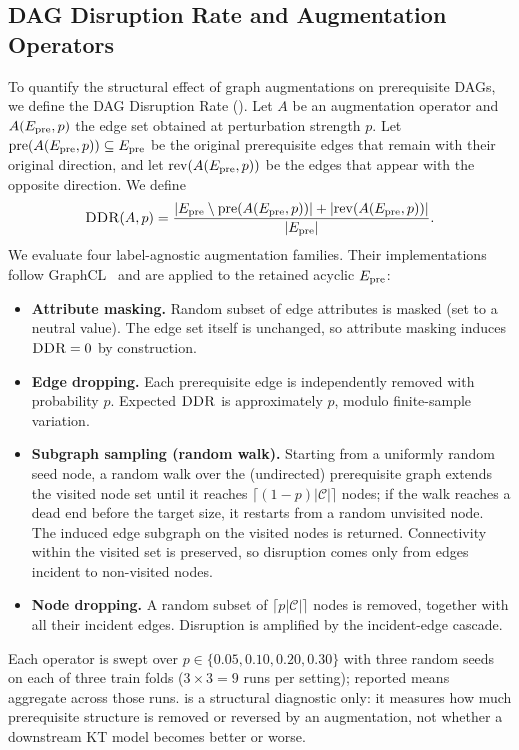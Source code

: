 \subsection{DAG Disruption Rate and Augmentation Operators}
\label{sec:ddr}
To quantify the structural effect of graph augmentations on prerequisite
DAGs, we define the DAG Disruption Rate (\DDR{}). Let $A$ be an
augmentation operator and $A(E_{\text{pre}},p)$ the edge set obtained at
perturbation strength $p$. Let $\mathrm{pre}(A(E_{\text{pre}},p))\subseteq E_{\text{pre}}$
be the original prerequisite edges that remain with their original
direction, and let $\mathrm{rev}(A(E_{\text{pre}},p))$ be the edges that appear
with the opposite direction. We define
\begin{equation}
\textsc{DDR}(A,p)=
\frac{|E_{\text{pre}}\setminus \mathrm{pre}(A(E_{\text{pre}},p))|
      +|\mathrm{rev}(A(E_{\text{pre}},p))|}
     {|E_{\text{pre}}|}.
\label{eq:ddr}
\end{equation}
We evaluate four label-agnostic augmentation families. Their
implementations follow GraphCL~\cite{you2020graphcl} and are applied to
the retained acyclic $E_{\text{pre}}$:
\begin{itemize}
  \item \textbf{Attribute masking.} Random subset of edge attributes
  is masked (set to a neutral value). The edge set itself is
  unchanged, so attribute masking induces $\textsc{DDR}=0$ by construction.
  \item \textbf{Edge dropping.} Each prerequisite edge is independently
  removed with probability $p$. Expected $\textsc{DDR}$ is approximately $p$,
  modulo finite-sample variation.
  \item \textbf{Subgraph sampling (random walk).} Starting from a
  uniformly random seed node, a random walk over the (undirected)
  prerequisite graph extends the visited node set until it reaches
  $\lceil(1-p)|\mathcal{C}|\rceil$ nodes; if the walk reaches a dead
  end before the target size, it restarts from a random unvisited
  node. The induced edge subgraph on the visited nodes is returned.
  Connectivity within the visited set is preserved, so disruption
  comes only from edges incident to non-visited nodes.
  \item \textbf{Node dropping.} A random subset of $\lceil p|\mathcal{C}|\rceil$
  nodes is removed, together with all their incident edges. Disruption
  is amplified by the incident-edge cascade.
\end{itemize}
Each operator is swept over $p\in\{0.05,0.10,0.20,0.30\}$ with three
random seeds on each of three train folds ($3\times 3=9$ runs per
setting); reported means aggregate across those runs. \DDR{} is a structural diagnostic only: it measures how
much prerequisite structure is removed or reversed by an augmentation,
not whether a downstream KT model becomes better or worse.
